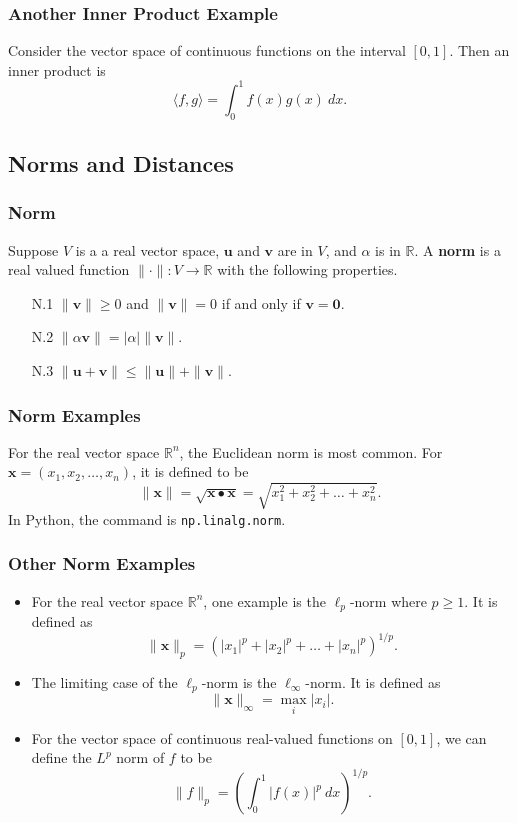 \documentclass{beamer}
\begin{document}
\begin{frame}
\frametitle{Another Inner Product Example}
Consider the vector space of continuous functions on the interval $[0, 1]$. Then an inner product is
$$
\langle f, g\rangle = \int_0^1 f(x) g(x)\ dx.
$$
\end{frame}

\subsection{Norms and Distances}

\begin{frame}
\frametitle{Norm}
\begin{Definition}
Suppose $V$ is a a real vector space, ${\boldsymbol u}$ and ${\boldsymbol v}$ are in $V$, and $\alpha$ is in $\mathbb{R}$. A {\bf norm} is a real valued function $\|\cdot\|: V\to \mathbb{R}$  with the following properties.
\begin{enumerate}
\item[N.1] $\| {\boldsymbol v}\| \geq 0$ and $\| {\boldsymbol v}\| = 0$ if and only if ${\boldsymbol v} = {\boldsymbol 0}$.
\item[N.2] $\|\alpha {\boldsymbol v}\| = |\alpha| \| {\boldsymbol v}\|$.
\item[N.3] $\| {\boldsymbol u} + {\boldsymbol v}\| \leq \| {\boldsymbol u}\| + \| {\boldsymbol v}\|$.
\end{enumerate}
\end{Definition}
\end{frame}

\begin{frame}
\frametitle{Norm Examples}
For the real vector space $\mathbb{R}^n$, the Euclidean norm is most common. For ${\boldsymbol x} = \left(x_1, x_2, \ldots, x_n\right)$, it is defined to be
$$
\| {\boldsymbol x}\| = \sqrt{{\boldsymbol x}\bullet{\boldsymbol x}} =  \sqrt{x_1^2 + x_2^2 +\ldots + x_n^2}.
$$
In Python, the command is \texttt{np.linalg.norm}.
\end{frame}

\begin{frame}
\frametitle{Other Norm Examples}
\begin{itemize}
\item For the real vector space $\mathbb{R}^n$, one example is the $\ell_p$-norm where $p\geq 1$. It is defined as
$$
\| {\boldsymbol x}\|_p = \left(|x_1|^p + |x_2|^p + \ldots + |x_n|^p\right)^{1/p}.
$$
\item The limiting case of the $\ell_p$-norm is the $\ell_\infty$-norm. It is defined as
$$
\| {\boldsymbol x}\|_\infty = \max_{i} |x_i|.
$$

\item For the vector space of continuous real-valued functions on $[0, 1]$, we can define the $L^p$ norm of $f$ to be
$$
\| f\|_p = \left(\int_0^1 |f(x)|^p\ dx\right)^{1/p}.
$$
\end{itemize}
\end{frame}
\end{document}

